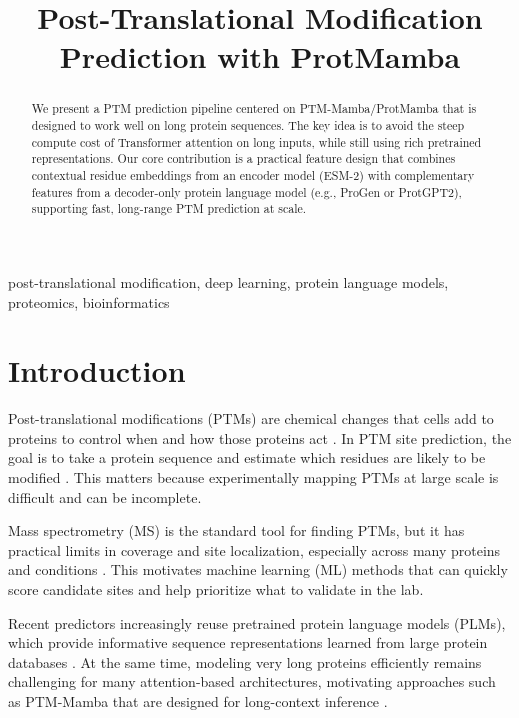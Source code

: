 \documentclass[conference]{IEEEtran}
\begin{document}
\title{Post-Translational Modification Prediction with ProtMamba}

\author{
}

\maketitle

\begin{abstract}
We present a PTM prediction pipeline centered on PTM-Mamba/ProtMamba that is designed to work well on long protein sequences. The key idea is to avoid the steep compute cost of Transformer attention on long inputs, while still using rich pretrained representations. Our core contribution is a practical feature design that combines contextual residue embeddings from an encoder model (ESM-2) with complementary features from a decoder-only protein language model (e.g., ProGen or ProtGPT2), supporting fast, long-range PTM prediction at scale.
\end{abstract}

\begin{IEEEkeywords}
post-translational modification, deep learning, protein language models, proteomics, bioinformatics
\end{IEEEkeywords}

\section{Introduction}
Post-translational modifications (PTMs) are chemical changes that cells add to proteins to control when and how those proteins act \cite{zhong2023ptm}. In PTM site prediction, the goal is to take a protein sequence and estimate which residues are likely to be modified \cite{li2022dbptm}. This matters because experimentally mapping PTMs at large scale is difficult and can be incomplete.

Mass spectrometry (MS) is the standard tool for finding PTMs, but it has practical limits in coverage and site localization, especially across many proteins and conditions \cite{messner2023mass}. This motivates machine learning (ML) methods that can quickly score candidate sites and help prioritize what to validate in the lab.

Recent predictors increasingly reuse pretrained protein language models (PLMs), which provide informative sequence representations learned from large protein databases \cite{elnaggar2021prottranscrackinglanguagelifes,elnaggar2020,lin2022}. At the same time, modeling very long proteins efficiently remains challenging for many attention-based architectures, motivating approaches such as PTM-Mamba that are designed for long-context inference \cite{peng2024ptm}.
\end{document}
